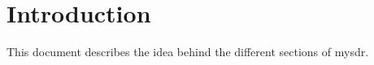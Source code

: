 \section{Introduction} %
    This document describes the idea behind the different sections of mysdr.
